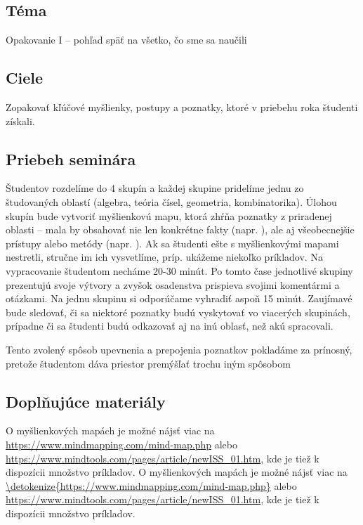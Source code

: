 
\subsection*{Téma}
Opakovanie I -- pohľad späť na všetko, čo sme sa naučili

\subsection*{Ciele}

Zopakovať kľúčové myšlienky, postupy a poznatky, ktoré v priebehu roka študenti získali.

\subsection*{Priebeh seminára}


Študentov rozdelíme do 4 skupín a každej skupine pridelíme jednu zo študovaných oblastí (algebra, teória čísel, geometria, kombinatorika). Úlohou skupín bude vytvoriť myšlienkovú mapu, ktorá zhŕňa poznatky z priradenej oblasti -- mala by obsahovať nie len konkrétne fakty (napr. ), ale aj všeobecnejšie prístupy alebo metódy (napr. ).  Ak sa študenti ešte s myšlienkovými mapami nestretli, stručne im ich vysvetlíme, príp. ukážeme niekoľko príkladov. Na vypracovanie študentom necháme 20-30 minút. Po tomto čase jednotlivé skupiny prezentujú svoje výtvory a zvyšok osadenstva prispieva svojimi komentármi a otázkami. Na jednu skupinu si odporúčame vyhradiť aspoň 15 minút. Zaujímavé bude sledovať, či sa niektoré poznatky budú vyskytovať vo viacerých skupinách, prípadne či sa študenti budú odkazovať aj na inú oblasť, než akú spracovali.

Tento zvolený spôsob upevnenia a prepojenia poznatkov pokladáme za prínosný, pretože študentom dáva priestor premýšľať trochu iným spôsobom 


\subsection*{Doplňujúce materiály}

O myšlienkových mapách je možné nájsť viac na \url{https://www.mindmapping.com/mind-map.php} alebo \url{https://www.mindtools.com/pages/article/newISS_01.htm}, kde je tiež k dispozícii množstvo príkladov. 
O myšlienkových mapách je možné nájsť viac na \url{\detokenize{https://www.mindmapping.com/mind-map.php}} alebo \url{https://www.mindtools.com/pages/article/newISS_01.htm}, kde je tiež k dispozícii množstvo príkladov.



